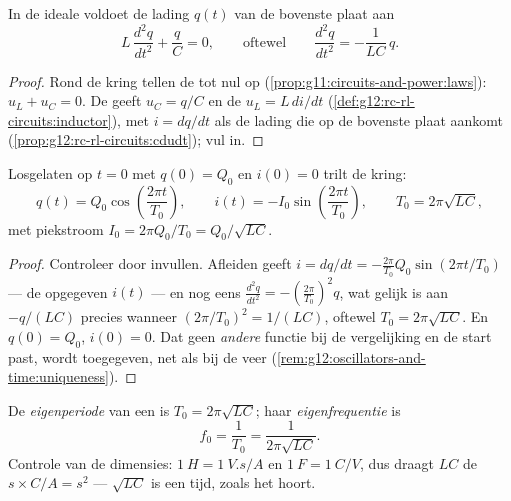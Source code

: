 \begin{proposition}[De LC-vergelijking]\label{prop:g12:rlc-oscillations:equation}
In de ideale  voldoet de lading $q(t)$ van de bovenste plaat aan
\[
L\,\frac{d^2q}{dt^2} + \frac{q}{C} = 0,
\qquad\text{oftewel}\qquad
\frac{d^2q}{dt^2} = -\frac{1}{LC}\,q .
\]
\end{proposition}

\begin{proof}
Rond de kring tellen de  tot nul op
(\cref{prop:g11:circuits-and-power:laws}): $u_L + u_C = 0$. De 
geeft $u_C = q/C$ en de  $u_L = L\,di/dt$
(\cref{def:g12:rc-rl-circuits:inductor}), met $i = dq/dt$ als de lading die op
de bovenste plaat aankomt
(\cref{prop:g12:rc-rl-circuits:cdudt}); vul in.
\end{proof}

\begin{theorem}\label{thm:g12:rlc-oscillations:oscillation}
Losgelaten op $t = 0$ met $q(0) = Q_0$ en $i(0) = 0$ trilt de kring:
\[
q(t) = Q_0 \cos\!\left(\frac{2\pi t}{T_0}\right),
\qquad
i(t) = -I_0 \sin\!\left(\frac{2\pi t}{T_0}\right),
\qquad
T_0 = 2\pi\sqrt{LC},
\]
met piekstroom $I_0 = 2\pi Q_0/T_0 = Q_0/\sqrt{LC}$.
\end{theorem}

\begin{proof}
Controleer door invullen. Afleiden geeft
$i = dq/dt = -\frac{2\pi}{T_0} Q_0 \sin(2\pi t/T_0)$ --- de opgegeven $i(t)$
--- en nog eens $\frac{d^2q}{dt^2} = -(\frac{2\pi}{T_0})^2 q$, wat gelijk is
aan $-q/(LC)$ precies wanneer $(2\pi/T_0)^2 = 1/(LC)$, oftewel
$T_0 = 2\pi\sqrt{LC}$. En $q(0) = Q_0$, $i(0) = 0$. Dat geen \emph{andere}
functie bij de vergelijking en de start past, wordt toegegeven, net als bij de
veer (\cref{rem:g12:oscillators-and-time:uniqueness}).
\end{proof}

\begin{definition}\label{def:g12:rlc-oscillations:period}
De \emph{eigenperiode} van een 
is $T_0 = 2\pi\sqrt{LC}$; haar
\emph{eigenfrequentie} is
\[
f_0 = \frac{1}{T_0} = \frac{1}{2\pi\sqrt{LC}} .
\]
Controle van de dimensies: $\qty{1}{H} = \qty{1}{V.s/A}$ en
$\qty{1}{F} = \qty{1}{C/V}$, dus draagt $LC$ de 
$\unit{s} \times \unit{C/A} = \unit{s^2}$ --- $\sqrt{LC}$ is een tijd, zoals
het hoort.
\end{definition}

